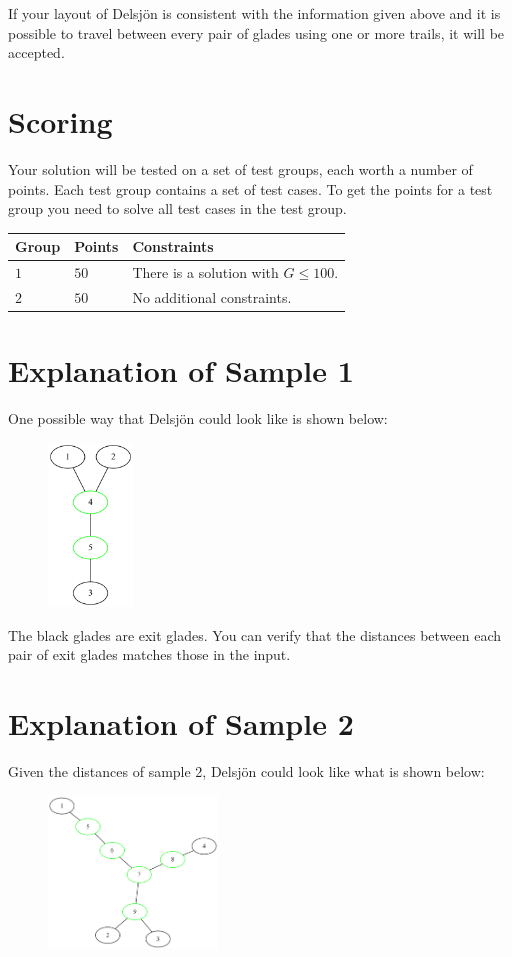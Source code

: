 If your layout of Delsjön is consistent with the information given above and it is possible to travel between
every pair of glades using one or more trails, it will be accepted.

\section*{Scoring}
Your solution will be tested on a set of test groups, each worth a number of points. Each test group contains
a set of test cases. To get the points for a test group you need to solve all test cases in the test group.

\noindent
\begin{tabular}{| l | l | p{12cm} |}
  \hline
  \textbf{Group} & \textbf{Points} & \textbf{Constraints} \\ \hline
  $1$    & $50$       & There is a solution with $G \leq 100$. \\ \hline
  $2$    & $50$       & No additional constraints. \\ \hline
\end{tabular}

\section*{Explanation of Sample 1}
One possible way that Delsjön could look like is shown below: 
\begin{center}
  \begin{figure}[h]
    \centering
    \includegraphics[width=0.2\textwidth]{sample-1.png}
  \end{figure}
\end{center}
The black glades are exit glades. You can verify that the distances 
between each pair of exit glades matches those in the input.

\section*{Explanation of Sample 2}
Given the distances of sample 2, Delsjön could look like what is shown below: 
\begin{center}
  \begin{figure}[h]
    \centering
    \includegraphics[width=0.4\textwidth]{sample-2.png}
  \end{figure}
\end{center}
